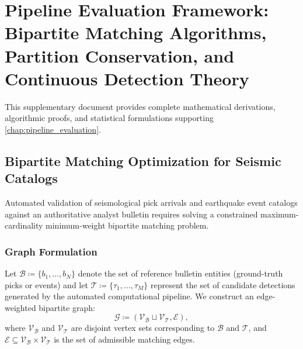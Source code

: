 
\section*{Pipeline Evaluation Framework: Bipartite Matching
Algorithms, Partition Conservation, and Continuous Detection Theory}
\label{sec:supp_pipeline_evaluation}

This supplementary document provides complete mathematical derivations,
algorithmic proofs, and statistical formulations supporting
\cref{chap:pipeline_evaluation}.


\subsection*{Bipartite Matching Optimization for Seismic Catalogs}
\label{subsec:supp_bipartite_matching}

Automated validation of seismological pick arrivals and earthquake
event catalogs
against an authoritative analyst bulletin requires solving a constrained
maximum-cardinality minimum-weight bipartite matching problem.

\subsubsection*{Graph Formulation}
Let $\mathcal{B} \coloneqq \{b_1, \dots, b_N\}$ denote the set of reference
bulletin entities (ground-truth picks or events) and let $\mathcal{T} \coloneqq
\{\tau_1, \dots, \tau_M\}$ represent the set of candidate detections generated
by the automated computational pipeline. We construct an
edge-weighted bipartite
graph:
\begin{equation}
  \mathcal{G} \coloneqq (\mathcal{V}_{\mathcal{B}} \sqcup
  \mathcal{V}_{\mathcal{T}}, \mathcal{E}),
  \label{eq:supp_bipartite_graph}
\end{equation}
where $\mathcal{V}_{\mathcal{B}}$ and $\mathcal{V}_{\mathcal{T}}$ are disjoint
vertex sets corresponding to $\mathcal{B}$ and $\mathcal{T}$, and
$\mathcal{E} \subseteq \mathcal{V}_{\mathcal{B}} \times
\mathcal{V}_{\mathcal{T}}$
is the set of admissible matching edges.

